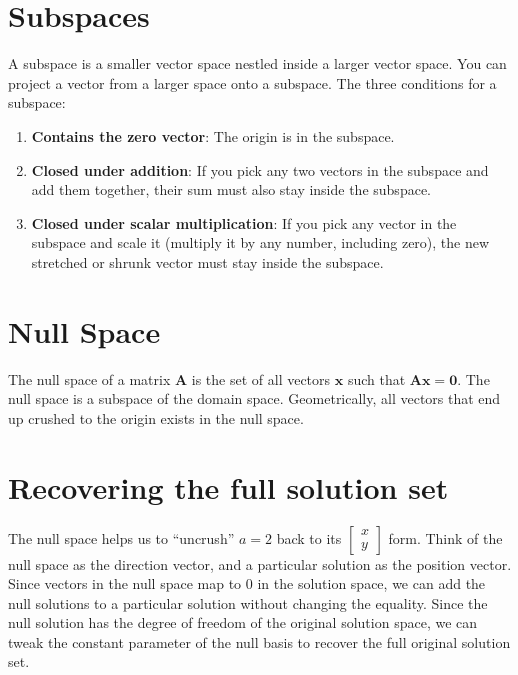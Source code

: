 \documentclass[11pt,a4paper]{article}
\begin{document}
\section{Subspaces}

A subspace is a smaller vector space nestled inside a larger vector space. You can project a vector from a larger space onto a subspace. The three conditions for a subspace:

\begin{enumerate}
    \item \textbf{Contains the zero vector}: The origin is in the subspace.
\item \textbf{Closed under addition}: If you pick any two vectors in the subspace and add them together, their sum must also stay inside the subspace.
\item \textbf{Closed under scalar multiplication}: If you pick any vector in the subspace and scale it (multiply it by any number, including zero), the new stretched or shrunk vector must stay inside the subspace.
\end{enumerate}

\section{Null Space}

The null space of a matrix \(\mathbf{A}\) is the set of all vectors \(\mathbf{x}\) such that \(\mathbf{A}\mathbf{x}=\mathbf{0}\). The null space is a subspace of the domain space. Geometrically, all vectors that end up crushed to the origin exists in the null space.

\section{Recovering the full solution set}

The null space helps us to ``uncrush'' \(a=2\) back to its \(\begin{bmatrix} x \\ y \end{bmatrix}\) form. Think of the null space as the direction vector, and a particular solution as the position vector. Since vectors in the null space map to 0 in the solution space, we can add the null solutions to a particular solution without changing the equality. Since the null solution has the degree of freedom of the original solution space, we can tweak the constant parameter of the null basis to recover the full original solution set.
\end{document}

